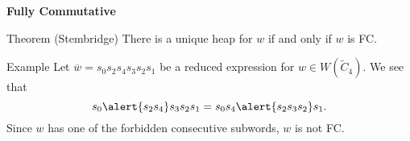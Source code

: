 \documentclass{beamer}
\newcommand{\w}{\overline{w}}
\newcommand{\C}{\widetilde{C}}
\newcommand\heapblock[4]{\fill[fill=#4, fill opacity=0.35, draw=#4, line width=1.1pt, rounded corners,shift={(\xxaxis:#1)},shift={(\yyaxis:#2)}] (-1,-1) rectangle (1,1);\node at (#1,#2) {\footnotesize $#3$};}
\newcommand\xxaxis{0}
\newcommand\yyaxis{90}
\begin{document}
\begin{frame}{\textbf{Fully Commutative}}
\begin{block}{Theorem (Stembridge)}
	There is a unique heap for $w$ if and only if $w$ is FC.
\end{block}

\begin{block}{Example}
	Let $\w=s_0s_2s_4s_3s_2s_1$ be a reduced expression for $w \in W(\C_4)$. We see that
	\[s_0\alert{s_2s_4}s_3s_2s_1=s_0s_4\alert{s_2s_3s_2}s_1.\]
	Since $w$ has one of the forbidden consecutive subwords, $w$ is \alert{not} FC.
	
\begin{columns}
\begin{column}{0.4\textwidth}
\begin{figure}\centering
{}
\end{figure}
\end{column}

\begin{column}{0.4\textwidth}
\begin{figure}\centering
{}
\end{figure}
\end{column}
\end{columns}


\end{block}


	
\end{frame}

\end{document}
